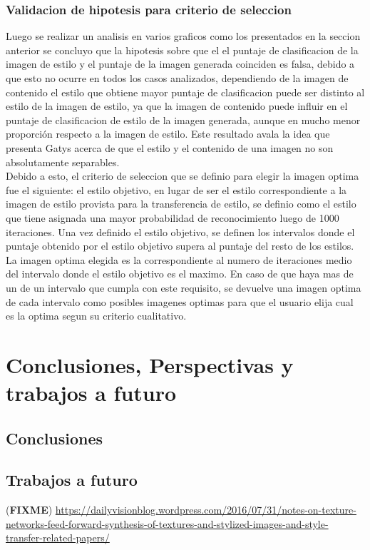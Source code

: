 \documentclass[a4paper,11pt,spanish]{book}
\newcommand*{\FIXME}[1]{{(\textbf{FIXME}) {#1}}}
\begin{document}
    \subsection{Validacion de hipotesis para criterio de seleccion}
      Luego se realizar un analisis en varios graficos como los presentados en la seccion anterior se concluyo que la hipotesis sobre que el el puntaje de clasificacion de la imagen
      de estilo y el puntaje de la imagen generada coinciden es falsa, debido a que esto no ocurre en todos los casos analizados, dependiendo de la imagen de contenido el estilo
      que obtiene mayor puntaje de clasificacion puede ser distinto al estilo de la imagen de estilo, ya que la imagen de contenido puede influir en el puntaje de clasificacion de estilo
      de la imagen generada, aunque en mucho menor proporción respecto a la imagen de estilo. Este resultado avala la idea que presenta Gatys acerca de que el estilo y el contenido de una
      imagen no son absolutamente separables.\\
      Debido a esto, el criterio de seleccion que se definio para elegir la imagen optima fue el siguiente: el estilo objetivo, en lugar de ser el estilo correspondiente a la imagen de estilo
      provista para la transferencia de estilo, se definio como el estilo que tiene asignada una mayor
      probabilidad de reconocimiento luego de 1000 iteraciones. Una vez definido el estilo objetivo, se definen los intervalos donde el puntaje obtenido por el estilo objetivo
      supera al puntaje del resto de los estilos. La imagen optima elegida es la correspondiente al numero de iteraciones medio del intervalo donde el estilo objetivo es el maximo. En caso de que haya mas de un de
      un intervalo que cumpla con este requisito, se devuelve una imagen optima de cada intervalo como posibles imagenes optimas para que el usuario elija cual es la optima segun su criterio
      cualitativo.


\chapter{Conclusiones, Perspectivas y trabajos a futuro}
  \section{Conclusiones}
  \section{Trabajos a futuro}
    \FIXME{ \url{https://dailyvisionblog.wordpress.com/2016/07/31/notes-on-texture-networks-feed-forward-synthesis-of-textures-and-stylized-images-and-style-transfer-related-papers/}}
\end{document}
